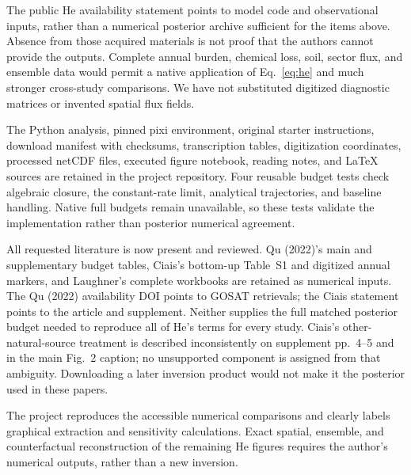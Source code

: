 \documentclass[11pt]{article}
\begin{document}
The public He availability statement points to model code and observational
inputs, rather than a numerical posterior archive sufficient for the items
above. Absence from those acquired materials is not proof that the authors
cannot provide the outputs. Complete annual burden, chemical loss, soil,
sector flux, and ensemble data would permit a native application of
Eq.~\ref{eq:he} and much stronger cross-study comparisons. We have not
substituted digitized diagnostic matrices or invented spatial flux fields.

The Python analysis, pinned pixi environment, original starter instructions,
download manifest with checksums, transcription tables, digitization
coordinates, processed netCDF files, executed figure notebook, reading notes,
and LaTeX sources are retained in the project repository. Four reusable budget tests check
algebraic closure, the constant-rate limit, analytical trajectories, and
baseline handling. Native full budgets remain unavailable, so these tests
validate the implementation rather than posterior numerical agreement.

All requested literature is now present and reviewed. Qu (2022)'s main and
supplementary budget tables, Ciais's bottom-up Table~S1 and digitized annual
markers, and Laughner's complete workbooks are retained as numerical inputs.
The Qu (2022) availability DOI points to GOSAT retrievals; the Ciais statement
points to the article and supplement. Neither supplies the full matched
posterior budget needed to reproduce all of He's terms for every study.
Ciais's other-natural-source treatment is described inconsistently on
supplement pp.~4--5 and in the main Fig.~2 caption; no unsupported component
is assigned from that ambiguity. Downloading a later inversion product would
not make it the posterior used in these papers.

The project reproduces the accessible numerical comparisons and clearly
labels graphical extraction and sensitivity calculations. Exact spatial,
ensemble, and counterfactual reconstruction of the remaining He figures
requires the author's numerical outputs, rather than a new inversion.



\end{document}
